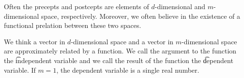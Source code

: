 

Often the precepts and postcepts are elements of $d$-dimensional and $m$-dimensional space, respectively.
Moreover, we often believe in the existence of a functional prelation between these two spaces.


We think a vector in $d$-dimensional space and a vector in $m$-dimensional space are approximately related by a function.
We call the argument to the function the \t{independent variable} and we call the result of the function the \t{dependent variable}.
If $m = 1$, the dependent variable is a single real number.

\blankpage
